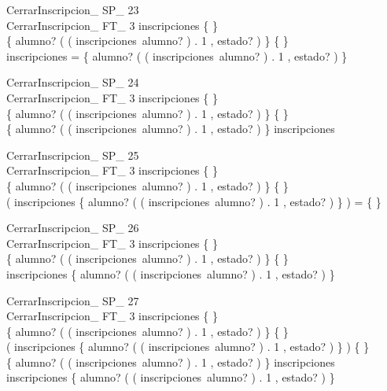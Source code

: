 \documentclass{article}
\begin{document}
 
 \begin{schema}{CerrarInscripcion\_ SP\_ 23}\\
  CerrarInscripcion\_ FT\_ 3 
 \where
  inscripciones \neq \{ \} \\
  \{ alumno? \mapsto ( ( inscripciones~alumno? ) . 1 , estado? ) \} \neq \{ \} \\
  \dom inscripciones = \dom \{ alumno? \mapsto ( ( inscripciones~alumno? ) . 1 , estado? ) \}
 \end{schema}
 
 
 \begin{schema}{CerrarInscripcion\_ SP\_ 24}\\
  CerrarInscripcion\_ FT\_ 3 
 \where
  inscripciones \neq \{ \} \\
  \{ alumno? \mapsto ( ( inscripciones~alumno? ) . 1 , estado? ) \} \neq \{ \} \\
  \dom \{ alumno? \mapsto ( ( inscripciones~alumno? ) . 1 , estado? ) \} \subset \dom inscripciones
 \end{schema}
 
 
 \begin{schema}{CerrarInscripcion\_ SP\_ 25}\\
  CerrarInscripcion\_ FT\_ 3 
 \where
  inscripciones \neq \{ \} \\
  \{ alumno? \mapsto ( ( inscripciones~alumno? ) . 1 , estado? ) \} \neq \{ \} \\
  ( \dom inscripciones \cap \dom \{ alumno? \mapsto ( ( inscripciones~alumno? ) . 1 , estado? ) \} ) = \{ \}
 \end{schema}
 
 
 \begin{schema}{CerrarInscripcion\_ SP\_ 26}\\
  CerrarInscripcion\_ FT\_ 3 
 \where
  inscripciones \neq \{ \} \\
  \{ alumno? \mapsto ( ( inscripciones~alumno? ) . 1 , estado? ) \} \neq \{ \} \\
  \dom inscripciones \subset \dom \{ alumno? \mapsto ( ( inscripciones~alumno? ) . 1 , estado? ) \}
 \end{schema}
 
 
 \begin{schema}{CerrarInscripcion\_ SP\_ 27}\\
  CerrarInscripcion\_ FT\_ 3 
 \where
  inscripciones \neq \{ \} \\
  \{ alumno? \mapsto ( ( inscripciones~alumno? ) . 1 , estado? ) \} \neq \{ \} \\
  ( \dom inscripciones \cap \dom \{ alumno? \mapsto ( ( inscripciones~alumno? ) . 1 , estado? ) \} ) \neq \{ \} \\
  \lnot \dom \{ alumno? \mapsto ( ( inscripciones~alumno? ) . 1 , estado? ) \} \subseteq \dom inscripciones \\
  \lnot \dom inscripciones \subseteq \dom \{ alumno? \mapsto ( ( inscripciones~alumno? ) . 1 , estado? ) \}
 \end{schema}
 
\end{document}
